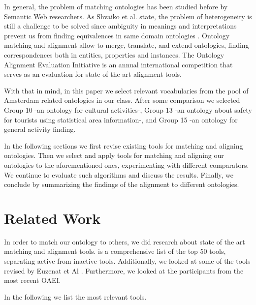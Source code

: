 \documentclass[runningheads,a4paper]{../../StyleFiles/llncs}
\begin{document}
In general, the problem of matching ontologies has been studied before by Semantic Web researchers. As Shvaiko et al. state, the problem of heterogeneity is still a challenge to be solved since ambiguity in meanings and interpretations prevent us from finding equivalences in same domain ontologies \cite{shvaiko2013ontology}. Ontology matching and alignment allow to merge, translate, and extend ontologies, finding correspondences both in entities, properties and instances. The Ontology Alignment Evaluation Initiative is an annual international competition that serves as an evaluation for state of the art alignment tools. 

With that in mind, in this paper we select relevant vocabularies from the pool of Amsterdam related ontologies in our class. After some comparison we selected Group 10 -an ontology for cultural activities-, Group 13 -an ontology about safety for tourists using statistical area information-, and Group 15 -an ontology for general activity finding.

In the following sections we first revise existing tools for matching and aligning ontologies. Then we select and apply tools for matching and aligning our ontologies to the aforementioned ones, experimenting with different comparators. We continue to evaluate such algorithms and discuss the results. Finally, we conclude by summarizing the findings of the alignment to different ontologies.

\section{Related Work}
\label{related_work}
In order to match our ontology to others, we did research about state of the art matching and alignment tools. \cite{adaptiveInformation_2014} is a comprehensive list of the top 50 tools, separating active from inactive tools. Additionally, we looked at some of the tools revised by Euzenat et Al \cite{euzenat2007ontology}. Furthermore, we looked at the participants from the most recent OAEI.

In the following we list the most relevant tools.
\end{document}
